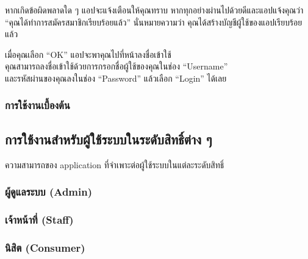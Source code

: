หากเกิดข้อผิดพลาดใด ๆ แอปจะแจ้งเตือนให้คุณทราบ
หากทุกอย่างผ่านไปด้วยดีและแอปแจ้งคุณว่า ``คุณได้ทำการสมัครสมาชิกเรียบร้อยแล้ว'' นั่นหมายความว่า คุณได้สร้างบัญชีผู้ใช้ของแอปเรียบร้อยแล้ว

เมื่อคุณเลือก ``OK'' แอปจะพาคุณไปที่หน้าลงชื่อเข้าใช้\\
คุณสามารถลงชื่อเข้าใช้ด้วยการกรอกชื่อผู้ใช้ของคุณในช่อง ``Username''\\
และรหัสผ่านของคุณลงในช่อง ``Password'' แล้วเลือก ``Login'' ได้เลย

\clearpage

\subsubsection{การใช้งานเบื้องต้น}\label{subsubsec:basic-usage}

\blindtext[3]

\clearpage

\subsection{การใช้งานสำหรับผู้ใช้ระบบในระดับสิทธิ์ต่าง ๆ}\label{subsec:role-specific-usage}
ความสามารถของ application ที่จำเพาะต่อผู้ใช้ระบบในแต่ละระดับสิทธิ์

\subsubsection{ผู้ดูแลระบบ (Admin)}\label{subsubsec:role-usage-admin}
\blindtext[3]

\subsubsection{เจ้าหน้าที่ (Staff)}\label{subsubsec:role-usage-staff}
\blindtext[3]

\subsubsection{นิสิต (Consumer)}\label{subsubsec:role-usage-consumer}
\blindtext[3]

